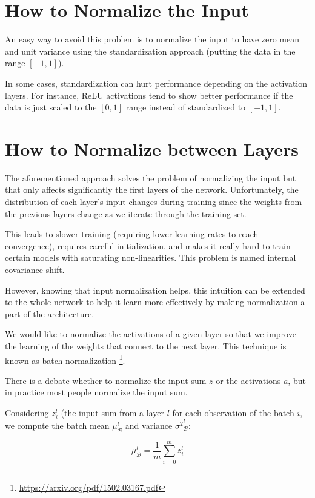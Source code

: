 \documentclass{article}
\begin{document}
\section{How to Normalize the Input}

An easy way to avoid this problem is to normalize the input to have zero mean and unit variance using the standardization approach (putting the data in the range $[-1, 1]$).

In some cases, standardization can hurt performance depending on the activation layers. For instance, ReLU activations tend to show better performance if the data is just scaled to the $[0, 1]$ range instead of standardized to $[-1, 1]$.

\section{How to Normalize between Layers}

The aforementioned approach solves the problem of normalizing the input but that only affects significantly the first layers of the network. Unfortunately, the distribution of each layer's input changes during training since the weights from the previous layers change as we iterate through the training set.

This leads to slower training (requiring lower learning rates to reach convergence), requires careful initialization, and makes it really hard to train certain models with saturating non-linearities. This problem is named internal covariance shift.

However, knowing that input normalization helps, this intuition can be extended to the whole network to help it learn more effectively by making normalization a part of the architecture.

We would like to normalize the activations of a given layer so that we improve the learning of the weights that connect to the next layer. This technique is known as batch normalization \footnote{\url{https://arxiv.org/pdf/1502.03167.pdf}}.

There is a debate whether to normalize the input sum $z$ or the activations $a$, but in practice most people normalize the input sum.

Considering $z^l_i$ (the input sum from a layer $l$ for each observation of the batch $i$, we compute the batch mean $\mu^l_{\mathcal{B}}$ and variance ${\sigma^2}^l_{\mathcal{B}}$:

\begin{equation}
\mu^l_{\mathcal{B}} = \frac{1}{m}\sum^m_{i=0}z^l_i
\end{equation}
\end{document}
